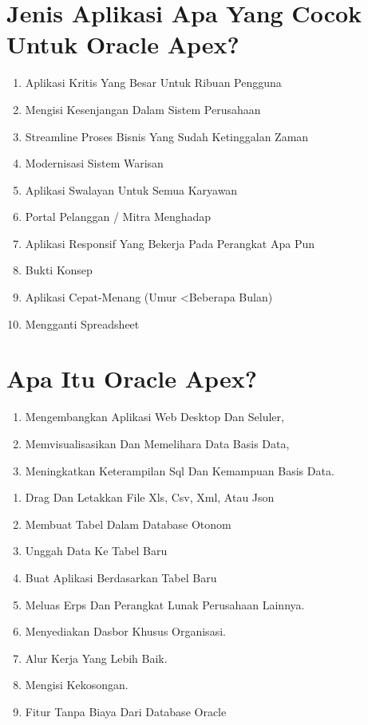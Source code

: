 \documentclass{article}
\begin{document}
\section{Jenis Aplikasi Apa Yang Cocok Untuk Oracle Apex?}
\begin{enumerate}
    \item Aplikasi Kritis Yang Besar Untuk Ribuan Pengguna
\item Mengisi Kesenjangan Dalam Sistem Perusahaan
\item Streamline Proses Bisnis Yang Sudah Ketinggalan Zaman
\item Modernisasi Sistem Warisan
\item Aplikasi Swalayan Untuk Semua Karyawan
\item Portal Pelanggan / Mitra Menghadap
\item Aplikasi Responsif Yang Bekerja Pada Perangkat Apa Pun
\item Bukti Konsep
\item Aplikasi Cepat-Menang (Umur <Beberapa Bulan)
\item Mengganti Spreadsheet
\end{enumerate}

\section{Apa Itu Oracle Apex?}
\begin{enumerate}
    \item Mengembangkan Aplikasi Web Desktop Dan Seluler, 
\item Memvisualisasikan Dan Memelihara Data Basis Data, 
\item Meningkatkan Keterampilan Sql Dan Kemampuan Basis Data.
\end{enumerate}
\newpage
\usepackage{Oracle Apex: Use Cases}
\begin{enumerate}
    \item Drag Dan Letakkan File Xls, Csv, Xml, Atau Json
\item Membuat Tabel Dalam Database Otonom
\item Unggah Data Ke Tabel Baru
\item Buat Aplikasi Berdasarkan Tabel Baru
\item Meluas Erps Dan Perangkat Lunak Perusahaan Lainnya.
\item Menyediakan Dasbor Khusus Organisasi.
\item Alur Kerja Yang Lebih Baik.
\item Mengisi Kekosongan.
\item Fitur Tanpa Biaya Dari Database Oracle
\end{enumerate}
\end{document}
